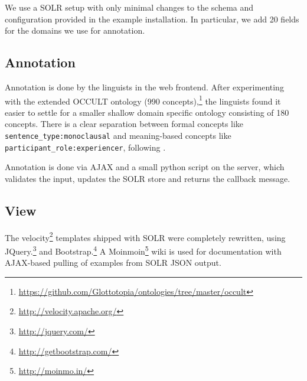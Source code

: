 \documentclass[10pt, a4paper]{article}
\begin{document}
We use a SOLR setup with only minimal changes to the schema and configuration provided in the example installation. In particular, we add 20 fields for the domains we use for annotation.

\subsection{Annotation}
Annotation is done by the linguists in the web frontend. After experimenting with the extended OCCULT ontology (990 concepts),\footnote{\url{https://github.com/Glottotopia/ontologies/tree/master/occult}} the linguists found it easier to settle for a smaller shallow domain specific ontology consisting of 180 concepts. There is a clear separation between formal concepts like  \texttt{\small sen\-tence\_type:monoclausal} and meaning-based concepts like \texttt{\small participant\_role:ex\-pe\-rien\-cer}, following \cite{Nordhoff2012fufomp}.

Annotation is done via AJAX and a small python script on the server, which validates the input, updates the SOLR store and returns the callback message. 


\subsection{View}
The velocity\footnote{\url{http://velocity.apache.org/}} templates shipped with SOLR were completely rewritten, using JQuery.\footnote{\url{http://jquery.com/}}  and  Bootstrap.\footnote{\url{http://getbootstrap.com/}} 
A Moinmoin\footnote{\url{http://moinmo.in/}} wiki is used for documentation with AJAX-based pulling of examples from SOLR JSON output. 
   
\end{document}
